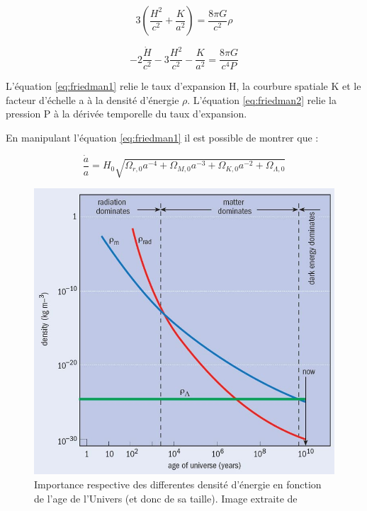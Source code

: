 
\begin{equation}
3 \left( \frac{H^2}{c^2} +\frac{K}{a^2} \right) = \frac{8 \pi G }{c^2} \rho
\label{eq:friedman1}
\end{equation}

\begin{equation}
-2 \frac{ \dot{H}}{c^2} -3 \frac{H^2}{c^2} -\frac{K}{a^2} = \frac{8 \pi G }{c^4 P}
\label{eq:friedman2}
\end{equation}

L'équation \ref{eq:friedman1} relie le taux d'expansion H, la courbure spatiale K et le facteur d'échelle a à la densité d'énergie $\rho$.
L'équation \ref{eq:friedman2} relie la pression P à la dérivée temporelle du taux d'expansion.
 
  
En manipulant l'équation \ref{eq:friedman1} il est possible de montrer que :


\begin{equation}
\frac{\dot{a}}{a} = H_0 \sqrt{ \Omega_{r,0} a^{-4} +  \Omega_{M,0} a^{-3} + \Omega_{K,0}a^{-2} + \Omega_{\Lambda,0}  } 
\label{eq:scale_t}
\end{equation}


\begin{figure}[bth]
        \includegraphics[width=.9\linewidth]{img/01/dark4.jpg} 
        \caption{Importance respective des differentes densité d'énergie en fonction de l'age de l'Univers (et donc de sa taille). Image extraite de \citep{2005univ.book.....F}
        }
 		\label{fig:cosmoparamt}
\end{figure}


